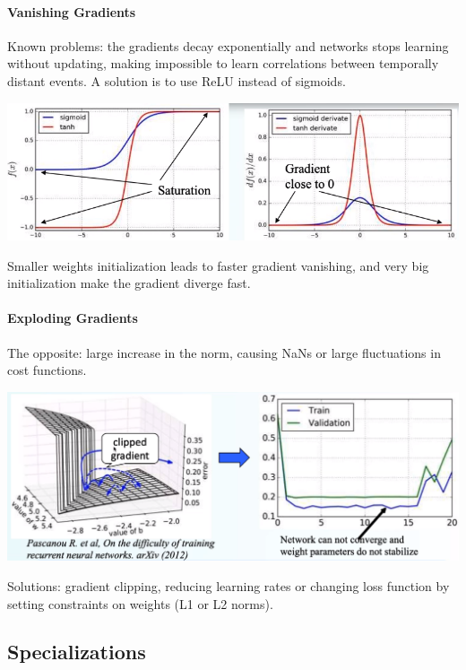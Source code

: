 \documentclass[10pt]{report}
\begin{document}
\paragraph{Vanishing Gradients} Known problems: the gradients decay exponentially and networks stops learning without updating, making impossible to learn correlations between temporally distant events. A solution is to use ReLU instead of sigmoids.
\begin{center}
	\includegraphics[scale=0.5]{28.png}
\end{center}
Smaller weights initialization leads to faster gradient vanishing, and very big initialization make the gradient diverge fast.
\paragraph{Exploding Gradients} The opposite: large increase in the norm, causing NaNs or large fluctuations in cost functions.
\begin{center}
	\includegraphics[scale=0.4]{29.png}
\end{center}
Solutions: gradient clipping, reducing learning rates or changing loss function by setting constraints on weights (L1 or L2 norms).
\subsection{Specializations}
\end{document}
